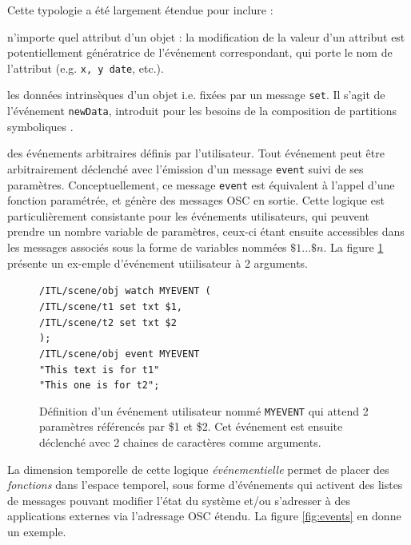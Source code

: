 \documentclass{article}
\newcommand{\OSC}[1]	{{\fontsize{9pt}{9pt} \selectfont\texttt{#1}}}
\let\olditemize\itemize
\let\oldenditemize\enditemize
\renewenvironment{itemize} 	{\olditemize \renewcommand{\labelitemi}{$\bullet$} \setlength{\itemsep}{0mm}}{\oldenditemize}
\newcommand{\sample}[1]		{\vspace{-0.2em}\begin{center}\colorbox{mygrey}{\begin{minipage}[t]{0.98\columnwidth} {\small \texttt{#1}}\end{minipage}}\end{center}}
\begin{document}
Cette typologie a été largement étendue pour inclure :
\begin{itemize}
\item n'importe quel attribut d'un objet : la modification de la valeur d'un attribut est potentiellement génératrice de l'événement correspondant, qui porte le nom de l'attribut (e.g. \OSC{x, y date}, etc.). 
\item les données intrinsèques d'un objet i.e. fixées par un message \OSC{set}. Il s'agit de l'événement \OSC{newData}, introduit pour les besoins de la composition de partitions symboliques \cite{lepetit16}.
\item des événements arbitraires définis par l'utilisateur.
\end{itemize}
\vspace*{1mm}
Tout événement peut être arbitrairement déclenché avec l'émission d'un message \OSC{event} suivi de ses paramètres. Conceptuellement, ce message \OSC{event} est équivalent à l'appel d'une fonction paramétrée, et génère des messages OSC en sortie. 
Cette logique est particulièrement consistante pour les événements utilisateurs, qui peuvent prendre un nombre variable de paramètres, ceux-ci étant ensuite accessibles dans les messages associés sous la forme de variables nommées $\$1...\$n$. La figure \ref{fig:uevent} présente un ex-emple d'événement utiilisateur à 2 arguments.

\begin{figure}[h]
   \centering
   \sample{/ITL/scene/obj watch MYEVENT ( \\
\hspace*{4mm}/ITL/scene/t1 set txt \$1, \\
\hspace*{4mm}/ITL/scene/t2 set txt \$2 \\
);   \\   
/ITL/scene/obj event MYEVENT \\
\hspace*{25mm}"This text is for t1"\\
\hspace*{25mm}"This one is for t2"; 
}
   \caption{Définition d'un événement utilisateur nommé \OSC{MYEVENT} qui attend 2 paramètres référencés par \$1 et \$2. Cet événement est ensuite déclenché avec 2 chaines de caractères comme arguments.}
   \label{fig:uevent}
\end{figure}


La dimension temporelle de cette logique \emph{événementielle} permet de placer des \emph{fonctions} dans l'espace temporel, sous forme d'événements qui activent des listes de messages pouvant modifier l'état du système et/ou s'adresser à des applications externes via l'adressage OSC étendu. La figure \ref{fig:events} en donne un exemple.
  
\end{document}
